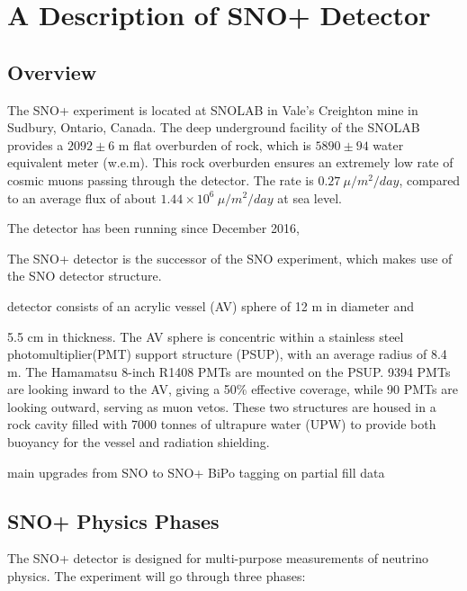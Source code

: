 


\section{A Description of SNO+ Detector}

\subsection{Overview}
The SNO+ experiment is located at SNOLAB in Vale's Creighton mine in Sudbury, Ontario, Canada. The deep underground facility of the SNOLAB provides a $2092\pm6$ m flat overburden of rock, which is $5890\pm94$ water equivalent meter (w.e.m). This rock overburden ensures an extremely low rate of cosmic muons passing through the detector. The rate is $0.27~\mu/m^2/day$, compared to an average flux of about $1.44\times 10^6~\mu/m^2/day$ at sea level\cite{muonflux}.

The detector has been running since December 2016\cite{ndpaper},


The SNO+ detector is the successor of the SNO experiment, which makes use of the SNO detector structure. 


detector consists of an acrylic vessel (AV) sphere of 12 m in diameter and

5.5 cm in thickness. The AV sphere is concentric within a stainless steel photomultiplier(PMT) support structure (PSUP), with an average radius of 8.4 m. The Hamamatsu 8-inch R1408 PMTs are mounted on the PSUP. 9394 PMTs are looking inward to the AV, giving a 50\% effective coverage, while 90 PMTs are looking outward, serving as muon vetos. These two structures are housed in a rock cavity filled with 7000 tonnes of ultrapure water (UPW) to provide both buoyancy for the vessel and radiation shielding.


main upgrades from SNO to SNO+
BiPo tagging on partial fill data

\subsection{SNO+ Physics Phases}
The SNO+ detector is designed for multi-purpose measurements of neutrino physics.
The experiment will go through three phases\cite{whitepaper}: 

